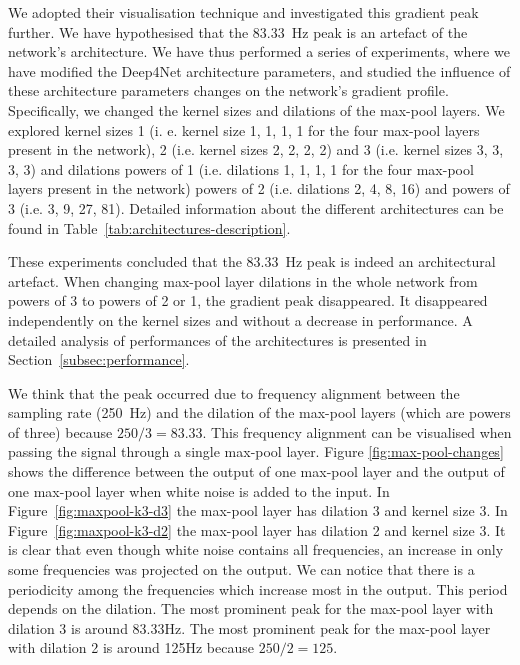 We adopted their visualisation technique and investigated this gradient peak further. We have hypothesised that the 83.33~Hz peak is an artefact of the network's architecture. We have thus 
performed a series of experiments, where we have modified the Deep4Net architecture parameters, and 
studied the influence of these architecture parameters changes on the network's gradient profile.
Specifically, we changed the kernel sizes and dilations of the max-pool layers. We explored kernel sizes 1 (i. e. kernel size 1, 1, 1, 1 for the four max-pool layers present in the network), 2 (i.e. kernel sizes 2, 2, 2, 2) and 3 (i.e. kernel sizes 3, 3, 3, 3) and dilations powers of 1 (i.e. dilations 1, 1, 1, 1  for the four max-pool layers present in the network) powers of 2 (i.e. dilations 2, 4, 8, 16) and powers of 3 (i.e. 3, 9, 27, 81). Detailed information about the different architectures can be found in Table~\ref{tab:architectures-description}.

These experiments concluded that the 83.33~Hz peak is indeed an architectural artefact. When changing max-pool layer dilations in the whole network from powers of 3 to powers of 2 or 1, the gradient peak disappeared. It disappeared independently on the kernel sizes and without a decrease in performance. A detailed analysis of performances of the architectures is presented in Section~\ref{subsec:performance}. 

We think that the peak occurred due to frequency alignment between the sampling rate (250~Hz) and the dilation of the max-pool layers (which are powers of three) because $ 250/3 = 83.33$. This frequency alignment can be visualised when passing the signal through a single max-pool layer. Figure \ref{fig:max-pool-changes} shows the difference between the output of one max-pool layer and the output of one max-pool layer when white noise is added to the input. In Figure~\ref{fig:maxpool-k3-d3} the max-pool layer has dilation 3 and kernel size 3. In Figure~\ref{fig:maxpool-k3-d2} the max-pool layer has dilation 2 and kernel size 3. It is clear that even though white noise contains all frequencies, an increase in only some frequencies was projected on the output. We can notice that there is a periodicity among the frequencies which increase most in the output.
This period depends on the dilation. The most prominent peak for the max-pool layer with dilation 3 is around 83.33Hz. The most prominent peak for the max-pool layer with dilation 2 is around 125Hz because $250/2 = 125$. 

